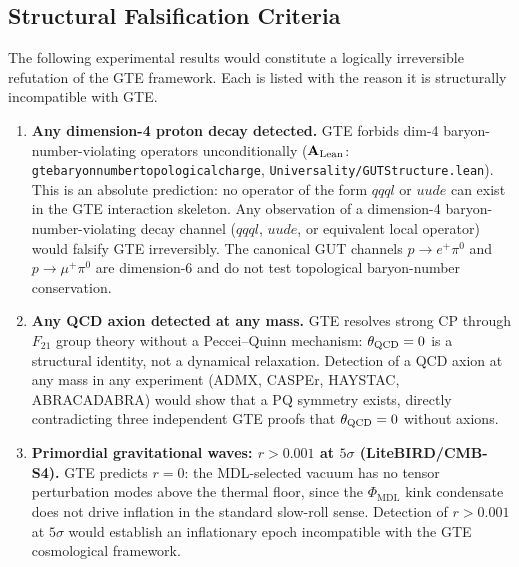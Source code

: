 \documentclass[11pt,openany]{book}
\theoremstyle{remark}
\newcommand{\PHIMDL}{\Phi_{\mathrm{MDL}}}
\newcommand{\lean}[1]{%
  \penalty-100
  \begingroup\def\_{\textunderscore\allowbreak}\texttt{#1}\endgroup}
\newcommand{\CatAL}{\ensuremath{\textbf{A}_{\rm Lean}}}
\begin{document}
\begin{appendices}
\section*{Structural Falsification Criteria}

\begin{tcolorbox}[colback=orange!5,colframe=orange!60,title={Five Observations That Would Definitively Falsify GTE},breakable]
The following experimental results would constitute a logically irreversible
refutation of the GTE framework.
Each is listed with the reason it is structurally incompatible with GTE.

\begin{enumerate}[leftmargin=*,itemsep=6pt]

\item \textbf{Any dimension-4 proton decay detected.}
GTE forbids dim-4 baryon-number-violating operators unconditionally
(\CatAL: \lean{gte\_baryon\_number\_topological\_charge}, \texttt{Universality/GUTStructure.lean}).
This is an absolute prediction: no operator of the form $qqql$ or $uude$ can exist
in the GTE interaction skeleton.
Any observation of a dimension-4 baryon-number-violating decay channel ($qqql$,
$uude$, or equivalent local operator) would falsify GTE irreversibly.
The canonical GUT channels $p\to e^+\pi^0$ and $p\to\mu^+\pi^0$ are dimension-6
and do not test topological baryon-number conservation.

\item \textbf{Any QCD axion detected at any mass.}
GTE resolves strong CP through $F_{21}$ group theory without a Peccei--Quinn
mechanism: $\theta_{\rm QCD}=0$ is a structural identity, not a dynamical relaxation.
Detection of a QCD axion at any mass in any experiment (ADMX, CASPEr, HAYSTAC,
ABRACADABRA) would show that a PQ symmetry exists, directly contradicting three
independent GTE proofs that $\theta_{\rm QCD}=0$ without axions.

\item \textbf{Primordial gravitational waves: $r > 0.001$ at $5\sigma$ (LiteBIRD/CMB-S4).}
GTE predicts $r=0$: the MDL-selected vacuum has no tensor perturbation modes above
the thermal floor, since the $\PHIMDL$ kink condensate does not drive inflation in
the standard slow-roll sense.
Detection of $r>0.001$ at $5\sigma$ would establish an inflationary epoch
incompatible with the GTE cosmological framework.


\end{enumerate}
\end{tcolorbox}
\end{appendices}
\end{document}
